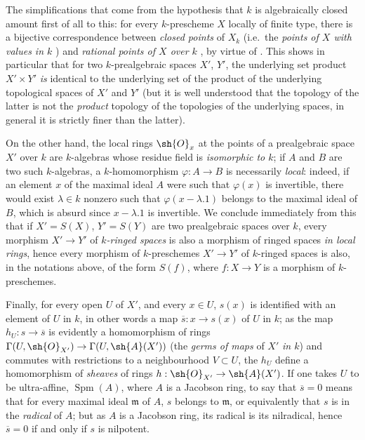 \begin{env}[10.10.3]
\label{IV.10.10.3}
The simplifications that come from the hypothesis that $k$ is algebraically closed amount first of all to this: for every $k$-prescheme $X$ locally of finite type, there is a bijective correspondence between \emph{closed points} of $X_k$ (i.e.\ the \emph{points of $X$ with values in $k$} ) and \emph{rational points of $X$ over $k$} , by virtue of .
This shows in particular  that for two $k$-prealgebraic spaces $X'$, $Y'$, the underlying set product $X'\times Y'$ \emph{is} identical to the underlying set of the product of the underlying topological spaces of $X'$ and $Y'$ (but it is well understood that the topology of the latter is not the \emph{product} topology of the topologies of the underlying spaces, in general it is strictly finer than the latter).

On the other hand, the local rings $\sh{O}_x$ at the points of a prealgebraic space $X'$ over $k$ are $k$-algebras whose residue field is \emph{isomorphic to $k$}; if $A$ and $B$ are two such $k$-algebras, a $k$-homomorphism $\varphi:A\to B$ is necessarily \emph{local}: indeed, if an element $x$ of the maximal ideal $A$ were such that $\varphi(x)$ is invertible, there would exist $\lambda\in k$ nonzero such that $\varphi(x-\lambda.1)$ belongs to the maximal ideal of $B$, which is absurd since $x-\lambda.1$ is invertible.
We conclude immediately from this that if $X'=S(X)$, $Y'=S(Y)$ are two prealgebraic spaces over $k$, every morphism $X'\to Y'$ of \emph{$k$-ringed spaces} is also a morphism of ringed spaces \emph{in local rings}, hence every morphism of $k$-preschemes $X'\to Y'$ of $k$-ringed spaces is also, in the notations above, of the form $S(f)$, where $f:X\to Y$ is a morphism of $k$-preschemes.

Finally, for every open $U$ of $X'$, and every $x\in U$, $s(x)$  is identified with an element of $U$ in $k$, in other words a map $\overline{s}:x\to s(x)$ of $U$ in $k$; as the map $h_U:s\to\overline{s}$ is evidently a homomorphism of rings $\Gamma(U,\sh{O}_{X'})\to\Gamma(U,\sh{A}(X'))$ (the \emph{germs of maps} of $X'$ \emph{in $k$}) and commutes with restrictions to a neighbourhood $V\subset U$, the $h_U$ define a homomorphism of \emph{sheaves} of rings $h:\sh{O}_{X'}\to\sh{A}(X')$.
If one takes $U$ to be ultra-affine, $\operatorname{Spm}(A)$, where $A$ is a Jacobson ring, to say that $\overline{s}=0$ means that for every maximal ideal $\mathfrak{m}$ of $A$, $s$ belongs to $\mathfrak{m}$, or equivalently that $s$ is in the \emph{radical} of $A$; but as $A$ is a Jacobson ring, its radical is its nilradical, hence $\overline{s}=0$ if and only if $s$ is nilpotent.
\end{env}

